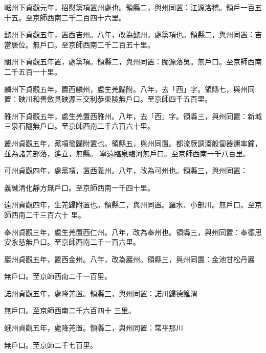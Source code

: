 \begin{pinyinscope}
 崌州下貞觀元年，招慰黨項置州處也。領縣二，與州同置：江源洛稽。領戶一百五十五。至京師西南二千二百四十六里。



 懿州下貞觀五年，置西吉州。八年，改為懿州，處黨項也。領縣二，與州同置：吉當唐位。無戶口。至京師西南二千二百五十里。



 闊州下貞觀五年置，處黨項。領縣二，與州同置：闊源落吳。無戶口。至京師西南二千五百一十里。



 麟州下貞觀五年，置西麟州，處生羌歸附。八年，去「西」字。領縣七，與州同置：硤川和善斂具硤源三交利恭東陵無戶口。至京師四千五百里。



 雅州下貞觀五年，處生羌置西雅州。八年，去「西」字。領縣三，與州同置：新城三泉石隴無戶口。至京師西南二千六百六十里。



 叢州貞觀五年，黨項發歸附置也。領縣五，與州同置。都流厥調湊般匐器邇率鐘，並為諸羌部落，遙立，無縣。
 寧遠臨泉臨河無戶口。至京師西南一千八百里。



 可州貞觀四年，處黨項，置西義州。八年，改為可州也。領縣三，與州同置：



 義誠清化靜方無戶口。至京師西南一千四十里。



 遠州貞觀四年，生羌歸附置也。領縣二，與州同置。羅水、小部川。無戶口。至京師西南二千三百六十
 里。



 奉州貞觀三年，處生羌置西仁州。八年，改為奉州也。領縣三，與州同置：奉德思安永慈無戶口。至京師西南二千一百六里。



 巖州貞觀五年，置西金州。八年，改為巖州。領縣三，與州同置：金池甘松丹巖



 無戶口。至京師西南二千一百里。



 諾州貞觀五年，處降羌置。領縣三，與州同置：諾川歸德籬渭



 無戶口。至京師西南二千六百四十
 三里。



 蛾州貞觀五年，處降羌置。領縣二，與州同置：常平那川



 無戶口。至京師二千七百里。




\end{pinyinscope}
